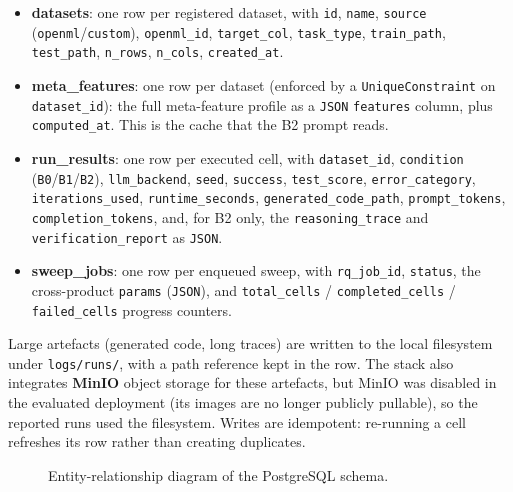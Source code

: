 \begin{itemize}
\raggedright
    \item \textbf{datasets}: one row per registered dataset, with
    \texttt{id}, \texttt{name}, \texttt{source}
    (\texttt{openml}/\texttt{custom}), \texttt{openml\_id},
    \texttt{target\_col}, \texttt{task\_type}, \texttt{train\_path},
    \texttt{test\_path}, \texttt{n\_rows}, \texttt{n\_cols},
    \texttt{created\_at}.
    \item \textbf{meta\_features}: one row per dataset (enforced by
    a \texttt{UniqueConstraint} on \texttt{dataset\_id}): the full
    meta-feature profile as a \texttt{JSON} \texttt{features} column,
    plus \texttt{computed\_at}. This is the cache that the B2 prompt
    reads.
    \item \textbf{run\_results}: one row per executed cell, with
    \texttt{dataset\_id}, \texttt{condition}
    (\texttt{B0}/\texttt{B1}/\texttt{B2}), \texttt{llm\_backend},
    \texttt{seed}, \texttt{success}, \texttt{test\_score},
    \texttt{error\_category}, \texttt{iterations\_used},
    \texttt{runtime\_seconds}, \texttt{generated\_code\_path},
    \texttt{prompt\_tokens}, \texttt{completion\_tokens}, and, for
    B2 only, the \texttt{reasoning\_trace} and
    \texttt{verification\_report} as \texttt{JSON}.
    \item \textbf{sweep\_jobs}: one row per enqueued sweep, with
    \texttt{rq\_job\_id}, \texttt{status}, the cross-product
    \texttt{params} (\texttt{JSON}), and \texttt{total\_cells} /
    \texttt{completed\_cells} / \texttt{failed\_cells} progress
    counters.
\end{itemize}

Large artefacts (generated code, long traces) are written to the local
filesystem under \texttt{logs/runs/}, with a path reference kept in the
row. The stack also integrates \textbf{MinIO} object storage for these
artefacts, but MinIO was disabled in the evaluated deployment (its
images are no longer publicly pullable), so the reported runs used the
filesystem. Writes are idempotent: re-running a cell refreshes its row
rather than creating duplicates.

\begin{figure}[H]
    \centering
    \caption{Entity-relationship diagram of the PostgreSQL schema.}
    \label{fig:er}
\end{figure}

